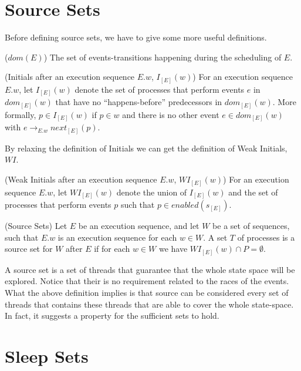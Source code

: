 
\section{Source Sets}

Before defining source sets, we have to give some more useful definitions.

\begin{definition}{($dom(E)$)}
    The set of events-transitions happening during the scheduling of $E$.
\end{definition}

\begin{definition}{(Initials after an execution sequence $E.w$, $I_{[E]}(w)$)}
For an execution sequence $E.w$, let $I_{[E]}(w)$ denote the set of
processes that perform events $e$ in $dom_{[E]}(w)$ that have no
“happens-before” predecessors in $dom_{[E]}(w)$. More formally,
$p \in I_{[E]}(w)$ if $p \in w$ and there is no other event $e \in dom_{[E]}(w)$ with
$e \rightarrow_{E.w} next_{[E]}(p)$.
\end{definition}

By relaxing the definition of Initials we can get the definition of Weak Initials, $WI$.

\begin{definition}{(Weak Initials after an execution sequence $E.w$, $WI_{[E]}(w)$)}
For an execution sequence $E.w$, let $WI_{[E]}(w)$ denote the union of $I_{[E]}(w)$ and the set of
processes that perform events $p$ such that $p \in enabled(s_{[E]}) $.
\end{definition}

\begin{definition}{(Source Sets)}
Let $E$ be an execution sequence,
and let $W$ be a set of sequences, such that $E.w$ is an execution
sequence for each $w \in W$. A set $T$ of processes is a source set for
$W$ after $E$ if for each $w \in W$ we have $WI_{[E]}(w) \cap P  = \emptyset$.
\end{definition}

A source set is a set of threads that guarantee that the whole state space will be explored. 
Notice that their is no requirement related to the races of the events.
What the above definition implies is that source can be considered every set of threads that contains these threads 
that are able to cover the whole state-space.
In fact, it suggests a property for the sufficient sets to hold.

\section{Sleep Sets}

